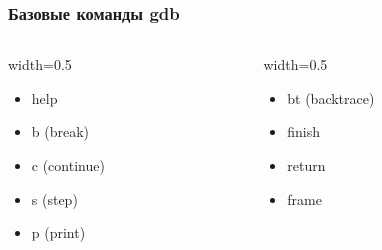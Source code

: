 \begin{frame}
  \frametitle{Базовые команды gdb}
  \begin{columns}
    \begin{column}{width=0.5\textwidth}
      \begin{itemize}
        \item help
        \item b (break)
        \item c (continue)
        \item s (step)
        \item p (print)
      \end{itemize}
    \end{column}
    \begin{column}{width=0.5\textwidth}
      \begin{itemize}
        \item bt (backtrace)
        \item finish
        \item return
        \item frame
      \end{itemize}
    \end{column}
  \end{columns}
\end{frame}
